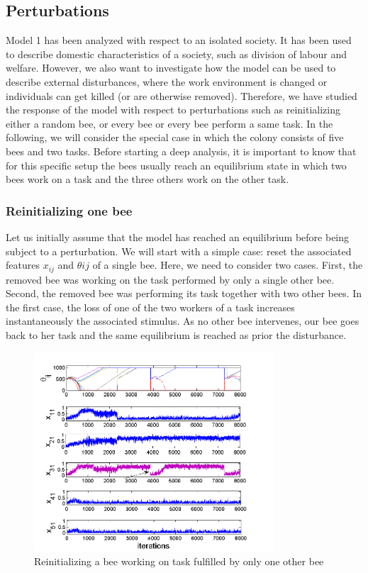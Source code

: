 \subsection{Perturbations}
Model 1 has been analyzed with respect to an isolated society. It has been used to describe domestic characteristics of a society, such as division of labour and welfare. However, we also want to investigate how the model can be used to describe external disturbances, where the work environment is changed or individuals can get killed (or are otherwise removed). Therefore, we have studied the response of the model with respect to perturbations such as reinitializing either a random bee, or every bee or every bee perform a same task.
In the following, we will consider the special case in which the colony consists of five bees and two tasks. Before starting a deep analysis, it is important to know that for this specific setup the bees usually reach an equilibrium state in which two bees work on a task and the three others work on the other task. 

\subsubsection{Reinitializing one bee}
Let us initially assume that the model has reached an equilibrium before being subject to a perturbation. We will start with a simple case: reset the associated features $x_{ij}$ and $\theta{ij}$ of a single bee. Here, we need to consider two cases. First, the removed bee was working on the task performed by only a single other bee. Second, the removed bee was performing its task together with two other bees. 
In the first case, the loss of one of the two workers of a task increases instantaneously the associated stimulus. As no other bee intervenes, our bee goes back to her task and the same equilibrium is reached as prior the disturbance. 

\begin{figure}[ht!]
	\centering
	\includegraphics[width=0.8\textwidth]{figures/figure1}
	\caption{Reinitializing a bee working on task fulfilled by only one other bee}
	\label{fig:figure1}
\end{figure}


